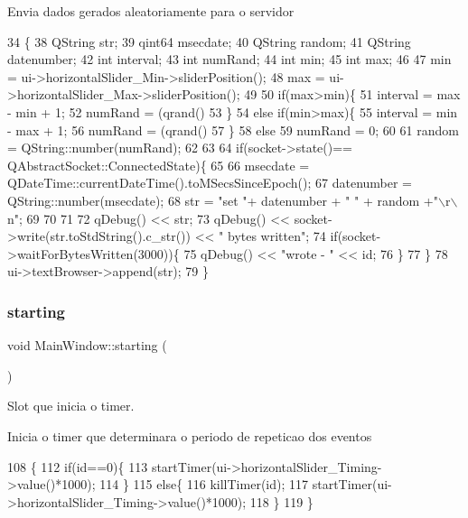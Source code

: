 Envia dados gerados aleatoriamente para o servidor
\begin{DoxyCode}
34                         \{
38   QString str;
39   qint64 msecdate;
40   QString random;
41   QString datenumber;
42   \textcolor{keywordtype}{int} interval;
43   \textcolor{keywordtype}{int} numRand;
44   \textcolor{keywordtype}{int} min;
45   \textcolor{keywordtype}{int} max;
46 
47   min = ui->horizontalSlider\_Min->sliderPosition();
48   max = ui->horizontalSlider\_Max->sliderPosition();
49 
50   \textcolor{keywordflow}{if}(max>min)\{
51     interval = max - min + 1;
52     numRand = (qrand()%
53   \}
54   \textcolor{keywordflow}{else} \textcolor{keywordflow}{if}(min>max)\{
55     interval = min - max + 1;
56     numRand = (qrand()%
57   \}
58   \textcolor{keywordflow}{else}
59       numRand = 0;
60 
61   random = QString::number(numRand);
62 
63 
64   \textcolor{keywordflow}{if}(socket->state()== QAbstractSocket::ConnectedState)\{
65 
66     msecdate = QDateTime::currentDateTime().toMSecsSinceEpoch();
67     datenumber = QString::number(msecdate);
68     str = \textcolor{stringliteral}{"set "}+ datenumber + \textcolor{stringliteral}{" "} + random +\textcolor{stringliteral}{"\(\backslash\)r\(\backslash\)n"};
69 
70 
71 
72       qDebug() << str;
73       qDebug() << socket->write(str.toStdString().c\_str()) << \textcolor{stringliteral}{" bytes written"};
74       \textcolor{keywordflow}{if}(socket->waitForBytesWritten(3000))\{
75         qDebug() << \textcolor{stringliteral}{"wrote - "} << id;
76       \}
77   \}
78   ui->textBrowser->append(str);
79 \}
\end{DoxyCode}
\mbox{\label{class_main_window_a756fd5832a55713567189c43d8aa27ca}} 
\subsubsection{\texorpdfstring{starting}{starting}}
{\footnotesize\ttfamily void Main\+Window\+::starting (\begin{DoxyParamCaption}{ }\end{DoxyParamCaption})\hspace{0.3cm}{\ttfamily [slot]}}



Slot que inicia o timer. 

Inicia o timer que determinara o periodo de repeticao dos eventos
\begin{DoxyCode}
108                          \{
112     \textcolor{keywordflow}{if}(\textcolor{keywordtype}{id}==0)\{
113         startTimer(ui->horizontalSlider\_Timing->value()*1000);
114     \}
115     \textcolor{keywordflow}{else}\{
116         killTimer(\textcolor{keywordtype}{id});
117         startTimer(ui->horizontalSlider\_Timing->value()*1000);
118     \}
119 \}
\end{DoxyCode}
\mbox{\label{class_main_window_a6ba0902dc1552226ae4a7866a42efee0}} 
